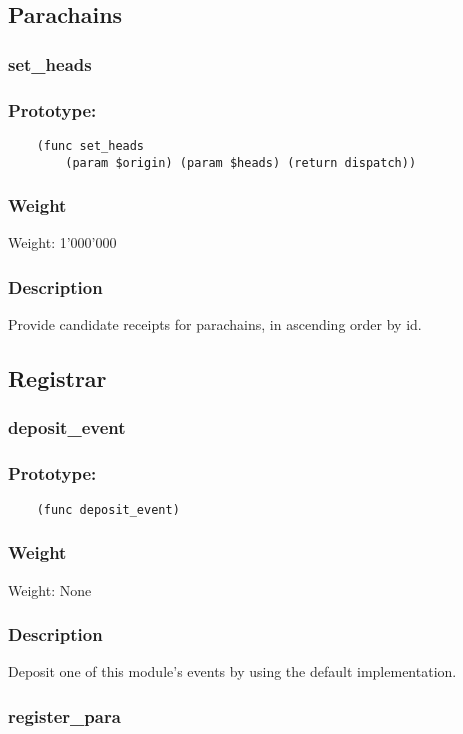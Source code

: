 \documentclass[11pt,a4paper]{article}
\begin{document}
\subsection{Parachains}
\subsubsection{set\_heads}
\subsubsection*{Prototype:}
\begin{verbatim}
    (func set_heads
        (param $origin) (param $heads) (return dispatch))
\end{verbatim}
\subsubsection*{Weight}
Weight: 1'000'000
\subsubsection*{Description}
Provide candidate receipts for parachains, in ascending order by id.

\subsection{Registrar}
\subsubsection{deposit\_event}
\subsubsection*{Prototype:}
\begin{verbatim}
    (func deposit_event)
\end{verbatim}
\subsubsection*{Weight}
Weight: None 
\subsubsection*{Description}
Deposit one of this module's events by using the default implementation.

\subsubsection{register\_para}
\end{document}
